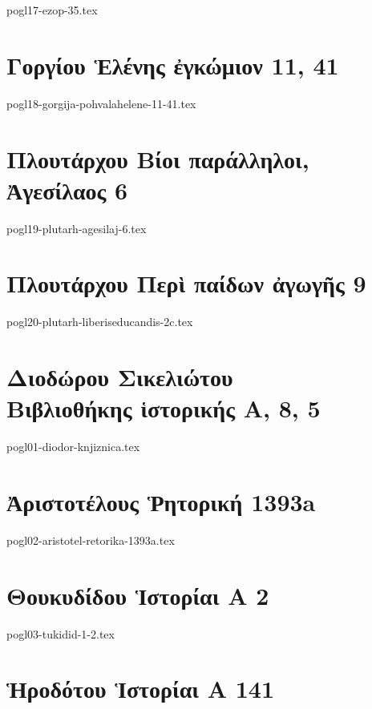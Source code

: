 \documentclass[a4paper,12pt,twoside]{report}
\begin{document}
{pogl17-ezop-35.tex}

\chapter[Γοργίου Ἑλένης ἐγκώμιον 11, 41]{\textgreek[variant=ancient]{Γοργίου Ἑλένης ἐγκώμιον} 11, 41}

{pogl18-gorgija-pohvalahelene-11-41.tex}

\chapter[Πλουτάρχου Ἀγεσίλαος]{\textgreek[variant=ancient]{Πλουτάρχου Βίοι παράλληλοι, \\Ἀγεσίλαος} 6}

{pogl19-plutarh-agesilaj-6.tex}

\chapter[Πλουτάρχου Περὶ παίδων ἀγωγῆς]{\textgreek[variant=ancient]{Πλουτάρχου Περὶ παίδων ἀγωγῆς} 9}

{pogl20-plutarh-liberiseducandis-2c.tex}

\chapter[Διοδώρου Βιβλιοθήκης ἱστορικής Α]{\textgreek[variant=ancient]{Διοδώρου Σικελιώτου \\Βιβλιοθήκης ἱστορικής Α,} 8, 5}

{pogl01-diodor-knjiznica.tex}

\chapter[Ἀριστοτέλους Ῥητορική]{\textgreek[variant=ancient]{Ἀριστοτέλους Ῥητορική} 1393a}

{pogl02-aristotel-retorika-1393a.tex}

\chapter[Θουκυδίδου Ἱστορίαι Α 2]{\textgreek[variant=ancient]{Θουκυδίδου Ἱστορίαι Α} 2}

{pogl03-tukidid-1-2.tex}

\chapter[Ἡροδότου Ἱστορίαι Α 141]{\textgreek[variant=ancient]{Ἡροδότου Ἱστορίαι Α} 141}
\end{document}
